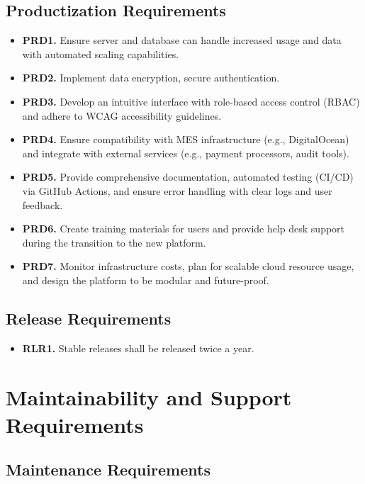 \documentclass[12pt]{article}
\begin{document}
\subsection{Productization Requirements}

\label{PRD}

\begin{itemize}
    \item \textbf{PRD1.} Ensure server and database can handle increased usage and data with automated scaling capabilities.
    \item \textbf{PRD2.} Implement data encryption, secure authentication.
    \item \textbf{PRD3.} Develop an intuitive interface with role-based access control (RBAC) and adhere to WCAG accessibility guidelines.
    \item \textbf{PRD4.} Ensure compatibility with MES infrastructure (e.g., DigitalOcean) and integrate with external services (e.g., payment processors, audit tools).
    \item \textbf{PRD5.} Provide comprehensive documentation, automated testing (CI/CD) via GitHub Actions, and ensure error handling with clear logs and user feedback.
    \item \textbf{PRD6.} Create training materials for users and provide help desk support during the transition to the new platform.
    \item \textbf{PRD7.} Monitor infrastructure costs, plan for scalable cloud resource usage, and design the platform to be modular and future-proof.
\end{itemize}

\subsection{Release Requirements}

\label{RLR}

\begin{itemize}
    \item \textbf{RLR1.} Stable releases shall be released twice a year.
\end{itemize}

\section{Maintainability and Support Requirements}
\subsection{Maintenance Requirements}
\end{document}
